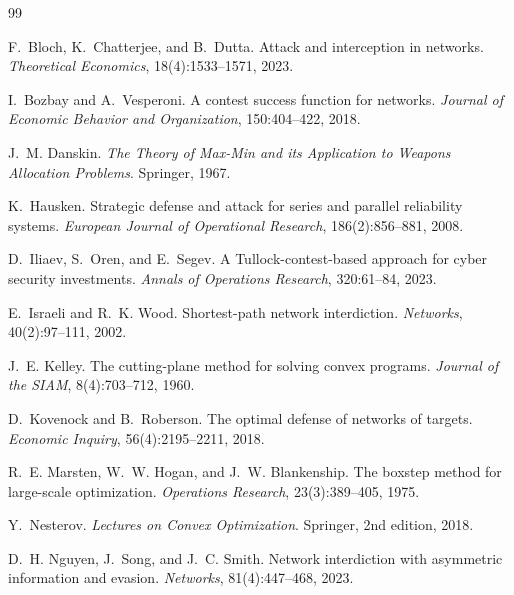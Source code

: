 \documentclass[10pt,a4paper,twoside]{article}
\theoremstyle{plain}
\theoremstyle{definition}
\begin{document}
\begin{thebibliography}{99}
\setlength{\itemsep}{0pt}

F.~Bloch, K.~Chatterjee, and B.~Dutta.
\newblock Attack and interception in networks.
\newblock \emph{Theoretical Economics}, 18(4):1533--1571, 2023.

I.~Bozbay and A.~Vesperoni.
\newblock A contest success function for networks.
\newblock \emph{Journal of Economic Behavior and Organization},
  150:404--422, 2018.

J.~M. Danskin.
\newblock \emph{The Theory of Max-Min and its Application to Weapons
  Allocation Problems}.
\newblock Springer, 1967.

K.~Hausken.
\newblock Strategic defense and attack for series and parallel reliability
  systems.
\newblock \emph{European Journal of Operational Research}, 186(2):856--881,
  2008.

D.~Iliaev, S.~Oren, and E.~Segev.
\newblock A Tullock-contest-based approach for cyber security investments.
\newblock \emph{Annals of Operations Research}, 320:61--84, 2023.

E.~Israeli and R.~K. Wood.
\newblock Shortest-path network interdiction.
\newblock \emph{Networks}, 40(2):97--111, 2002.

J.~E. Kelley.
\newblock The cutting-plane method for solving convex programs.
\newblock \emph{Journal of the SIAM}, 8(4):703--712, 1960.

D.~Kovenock and B.~Roberson.
\newblock The optimal defense of networks of targets.
\newblock \emph{Economic Inquiry}, 56(4):2195--2211, 2018.

R.~E. Marsten, W.~W. Hogan, and J.~W. Blankenship.
\newblock The boxstep method for large-scale optimization.
\newblock \emph{Operations Research}, 23(3):389--405, 1975.

Y.~Nesterov.
\newblock \emph{Lectures on Convex Optimization}.
\newblock Springer, 2nd edition, 2018.

D.~H. Nguyen, J.~Song, and J.~C. Smith.
\newblock Network interdiction with asymmetric information and evasion.
\newblock \emph{Networks}, 81(4):447--468, 2023.


\end{thebibliography}
\end{document}
